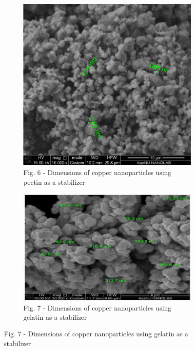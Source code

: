 \begin{figure}[H]
    \centering
    \begin{subfigure}[b]{0.45\textwidth}
        \centering
        \includegraphics[width=\textwidth]{assets/19}
        \caption*{Fig. 6 - Dimensions of copper nanoparticles using pectin as a stabilizer}
    \end{subfigure}
    \hfill
    \begin{subfigure}[b]{0.45\textwidth}
        \centering
        \includegraphics[width=\textwidth]{assets/20}
        \caption*{Fig. 7 - Dimensions of copper nanoparticles using gelatin as a stabilizer}
    \end{subfigure}
\end{figure}

